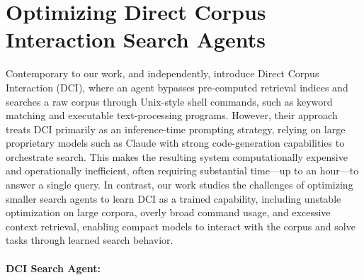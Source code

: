\documentclass{article} %
\begin{document}
\section{Optimizing Direct Corpus Interaction Search Agents}


Contemporary to our work, and independently, \citet{dci-agent} introduce Direct Corpus Interaction (DCI), where an agent bypasses pre-computed retrieval indices and searches a raw corpus through Unix-style shell commands, such as keyword matching and executable text-processing programs. However, their approach treats DCI primarily as an inference-time prompting strategy, relying on large proprietary models such as Claude with strong code-generation capabilities to orchestrate search. This makes the resulting system computationally expensive and operationally inefficient, often requiring substantial time---up to an hour---to answer a single query. In contrast, our work studies the challenges of optimizing smaller search agents to learn DCI as a trained capability, including unstable optimization on large corpora, overly broad command usage, and excessive context retrieval, enabling compact models to interact with the corpus and solve tasks through learned search behavior.



\paragraph{DCI Search Agent:}
\end{document}
